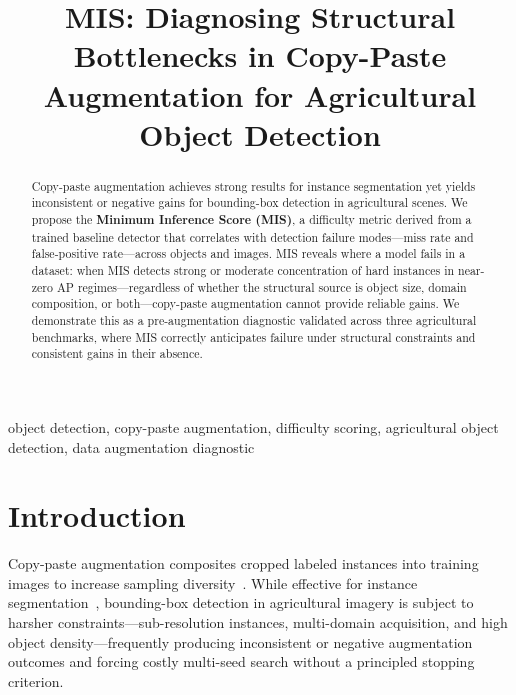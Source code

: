 \documentclass[conference]{IEEEtran}
\begin{document}
\title{MIS: Diagnosing Structural Bottlenecks in Copy-Paste Augmentation
for Agricultural Object Detection}

\author{
}

\maketitle

\begin{abstract}
Copy-paste augmentation achieves strong results for instance
segmentation yet yields inconsistent or negative gains for
bounding-box detection in agricultural scenes.
We propose the \textbf{Minimum Inference Score (MIS)}, a difficulty
metric derived from a trained baseline detector that correlates with
detection failure modes---miss rate and false-positive rate---across
objects and images.
MIS reveals where a model fails in a dataset: when MIS detects strong or 
moderate concentration of hard instances
in near-zero AP regimes---regardless of whether the structural source
is object size, domain composition, or both---copy-paste augmentation
cannot provide reliable gains.
We demonstrate this as a pre-augmentation diagnostic validated
across three agricultural benchmarks, where MIS correctly anticipates
failure under structural constraints and consistent gains in their absence.
\end{abstract}

\begin{IEEEkeywords}
object detection, copy-paste augmentation, difficulty scoring,
agricultural object detection, data augmentation diagnostic
\end{IEEEkeywords}

\section{Introduction}

Copy-paste augmentation composites cropped labeled instances into
training images to increase sampling diversity~\cite{kisantal2019augmentation,
ghiasi2021simple}.
While effective for instance
segmentation~\cite{ghiasi2021simple}, bounding-box detection in
agricultural imagery is subject to harsher constraints---sub-resolution
instances, multi-domain acquisition, and high object
density---frequently producing inconsistent or negative augmentation
outcomes and forcing costly multi-seed search without a principled
stopping criterion.
\end{document}
